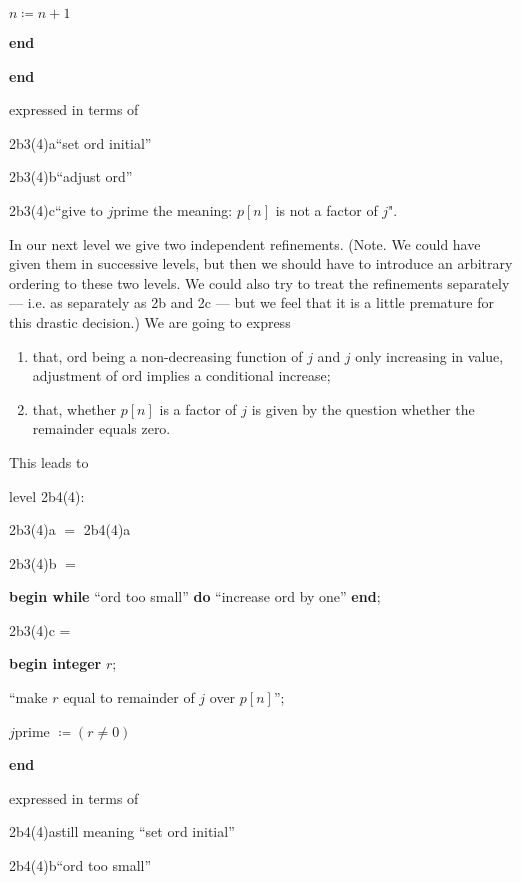 \noindent
\quad\quad\quad $n \coloneq n + 1$

\noindent
\quad\textbf{end}

\noindent
\textbf{end}

\noindent
expressed in terms of

\noindent
2b3(4)a\quad\quad ``set ord initial''

\noindent
2b3(4)b\quad\quad ``adjust ord''

\noindent
2b3(4)c\quad\quad ``give to $j$prime the meaning: $p[n]$ is not a factor of $j$". 

In our next level we give two independent refinements. (Note. We could have given them in successive levels, but then we should have to introduce an arbitrary ordering to these two levels. We could also try to treat the refinements separately --- i.e. as separately as 2b and 2c --- but we feel that it is a little premature for this drastic decision.) We are going to express

\begin{enumerate}[label=(\arabic*)]
	\item that, ord being a non-decreasing function of $j$ and $j$ only increasing in value, adjustment of ord implies a conditional increase;

	\item that, whether $p[n]$ is a factor of $j$ is given by the question whether the remainder equals zero.
\end{enumerate}

\noindent
This leads to

\noindent
level 2b4(4):

\noindent
2b3(4)a $=$ 2b4(4)a

\noindent
2b3(4)b $=$

\noindent
\textbf{begin while} ``ord too small'' \textbf{do} ``increase ord by one'' \textbf{end};

\noindent
2b3(4)c =

\noindent
\textbf{begin integer} $r$;

\noindent
\quad ``make $r$ equal to remainder of $j$ over $p[n]$'';

\noindent
\quad $j$prime $\coloneq (r \neq 0)$

\noindent
\textbf{end}

\noindent
expressed in terms of

\noindent
2b4(4)a\quad\quad still meaning ``set ord initial''

\noindent
2b4(4)b\quad\quad ``ord too small''

